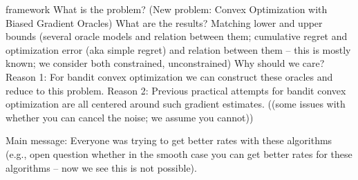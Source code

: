  framework
What is the problem? (New problem: Convex Optimization with Biased Gradient Oracles)
What are the results? Matching lower and upper bounds (several oracle models and relation between them; cumulative regret and optimization error (aka simple regret) and relation between them -- this is mostly known; we consider both constrained, unconstrained)
Why should we care? 
Reason 1: For bandit convex optimization we can construct these oracles and reduce to this problem.
Reason 2: Previous practical attempts for bandit convex optimization are all centered around such gradient estimates.
((some issues with whether you can cancel the noise; we assume you cannot))

Main message: Everyone was trying to get better rates with these algorithms (e.g., open question whether in the smooth case you can get better rates for these algorithms -- now we see this is not possible).
\fi
